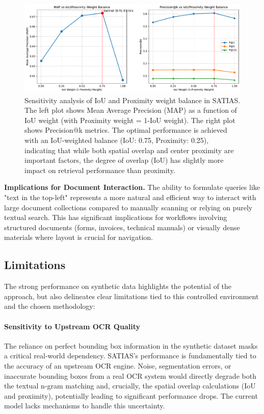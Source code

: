\documentclass[manuscript,screen]{acmart}
\begin{document}
\begin{figure}[htbp]
    \centering
    \includegraphics[width=\textwidth]{figures/sensitivity_analysis.pdf}
    \caption{Sensitivity analysis of IoU and Proximity weight balance in SATIAS. The left plot shows Mean Average Precision (MAP) as a function of IoU weight (with Proximity weight = 1-IoU weight). The right plot shows Precision@k metrics. The optimal performance is achieved with an IoU-weighted balance (IoU: 0.75, Proximity: 0.25), indicating that while both spatial overlap and center proximity are important factors, the degree of overlap (IoU) has slightly more impact on retrieval performance than proximity.}
    \label{fig:sensitivity}
\end{figure}

\textbf{Implications for Document Interaction.} The ability to formulate queries like "text in the top-left" represents a more natural and efficient way to interact with large document collections compared to manually scanning or relying on purely textual search. This has significant implications for workflows involving structured documents (forms, invoices, technical manuals) or visually dense materials where layout is crucial for navigation.

\subsection{Limitations}

The strong performance on synthetic data highlights the potential of the approach, but also delineates clear limitations tied to this controlled environment and the chosen methodology:

\paragraph{Sensitivity to Upstream OCR Quality}
The reliance on perfect bounding box information in the synthetic dataset masks a critical real-world dependency. SATIAS's performance is fundamentally tied to the accuracy of an upstream OCR engine. Noise, segmentation errors, or inaccurate bounding boxes from a real OCR system would directly degrade both the textual n-gram matching and, crucially, the spatial overlap calculations (IoU and proximity), potentially leading to significant performance drops. The current model lacks mechanisms to handle this uncertainty.
\end{document}
